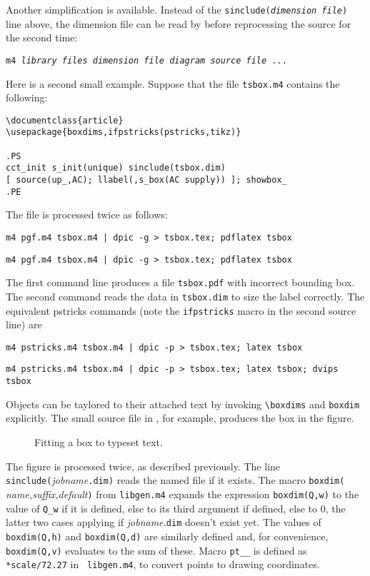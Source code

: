 Another simplification is available.  Instead of the
{\tt sinclude({\sl dimension file})} line
above, the dimension file can be read by \Mfour before reprocessing the source
for the second time:

{\tt m4 {\sl library files} {\sl dimension file} {\sl diagram source file} ...} 

Here is a second small example.  Suppose that the file {\tt tsbox.m4} contains
the following:

\pagebreak
\begin{verbatim}
\documentclass{article}
\usepackage{boxdims,ifpstricks(pstricks,tikz)}

.PS
cct_init s_init(unique) sinclude(tsbox.dim)
[ source(up_,AC); llabel(,s_box(AC supply)) ]; showbox_
.PE

\end{verbatim}
The file is processed twice as follows:

{\tt m4 pgf.m4 tsbox.m4 | dpic -g > tsbox.tex; pdflatex tsbox}
\par
{\tt m4 pgf.m4 tsbox.m4 | dpic -g > tsbox.tex; pdflatex tsbox}

\noindent
The first command line produces a file {\tt tsbox.pdf} with
incorrect bounding box.  The second command reads the data in {\tt tsbox.dim}
to size the label correctly.  The equivalent pstricks commands (note
the {\tt ifpstricks} macro in the second source line) are

{\tt m4 pstricks.m4 tsbox.m4 | dpic -p > tsbox.tex; latex tsbox}
\par
{\tt m4 pstricks.m4 tsbox.m4 | dpic -p > tsbox.tex; latex tsbox; dvips tsbox}
 
\hbox{}

Objects can be taylored to their attached text by invoking
\verb|\boxdims| and \verb|boxdim| explicitly.
The small source file in , for example,
produces the box in the figure.
\begin{figure}[ht]
   \parbox{4.2in}{\small  }%
   \hfill\llap{\raise-0.35in\hbox{ }}%
   \vspace{-\baselineskip}
   \caption{Fitting a box to typeset text.}
   \label{boxdims}
   \end{figure}

The figure is processed twice, as described previously.
The line \verb|sinclude(|{\sl jobname}\verb|.dim)| reads the named file
if it exists.  The macro \verb|boxdim(|{\sl
name,suffix,default}\verb|)| from {\tt libgen.m4} expands the
expression \verb|boxdim(Q,w)| to the value of \verb|Q_w| if it is
defined, else to its third argument if defined, else to 0, the latter
two cases applying if {\sl jobname.}\verb|dim| doesn't exist yet.  The
values of \verb|boxdim(Q,h)| and \verb|boxdim(Q,d)| are similarly
defined and, for convenience, \verb|boxdim(Q,v)| evaluates to the sum
of these.  Macro \verb|pt__| is defined as \verb|*scale/72.27| in {\tt
libgen.m4}, to convert points to drawing coordinates.

